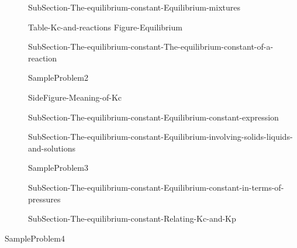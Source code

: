 \documentclass[main.tex]{subfiles}
\newcommand\chapterlabel{Ch-equilibrium}\setcounter{figurenewcounter}{0}\setcounter{tablenewcounter}{0}\setcounter{formulanewcounter}{0}
\begin{document}
\sloppy\begin{description}



\item[] {SubSection-The-equilibrium-constant-Equilibrium-mixtures}



 {Table-Kc-and-reactions}\newpage
{Figure-Equilibrium}

\item[] {SubSection-The-equilibrium-constant-The-equilibrium-constant-of-a-reaction}



  {SampleProblem2}

{SideFigure-Meaning-of-Kc}






\item[] {SubSection-The-equilibrium-constant-Equilibrium-constant-expression}

 
\item[] {SubSection-The-equilibrium-constant-Equilibrium-involving-solids-liquids-and-solutions}


  {SampleProblem3}


\item[] {SubSection-The-equilibrium-constant-Equilibrium-constant-in-terms-of-pressures}



\item[] {SubSection-The-equilibrium-constant-Relating-Kc-and-Kp}



\end{description}
  {SampleProblem4}
\end{document}
